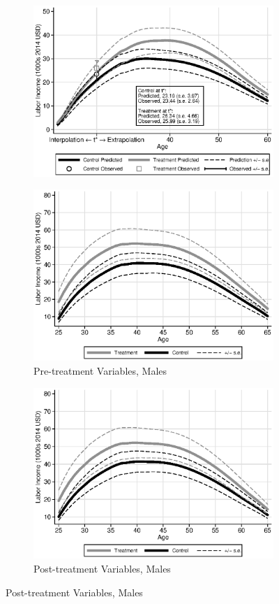 \begin{figure}
\begin{subfigure}[h]{0.3\textwidth}
		\includegraphics[width=\textwidth]{output/labor_25-65_pset1_mset3_female.eps}
\end{subfigure}
\begin{subfigure}[h]{0.3\textwidth}
		\centering
		\caption{Pre-treatment Variables, Males}
		\includegraphics[width=\textwidth]{output/labor_25-65_pset1_mset1_male.eps}
\end{subfigure}%
\begin{subfigure}[h]{0.3\textwidth}
	\centering
	\caption{Post-treatment Variables, Males}
		\includegraphics[width=\textwidth]{output/labor_25-65_pset1_mset2_male.eps}

\end{subfigure}
\end{figure}
